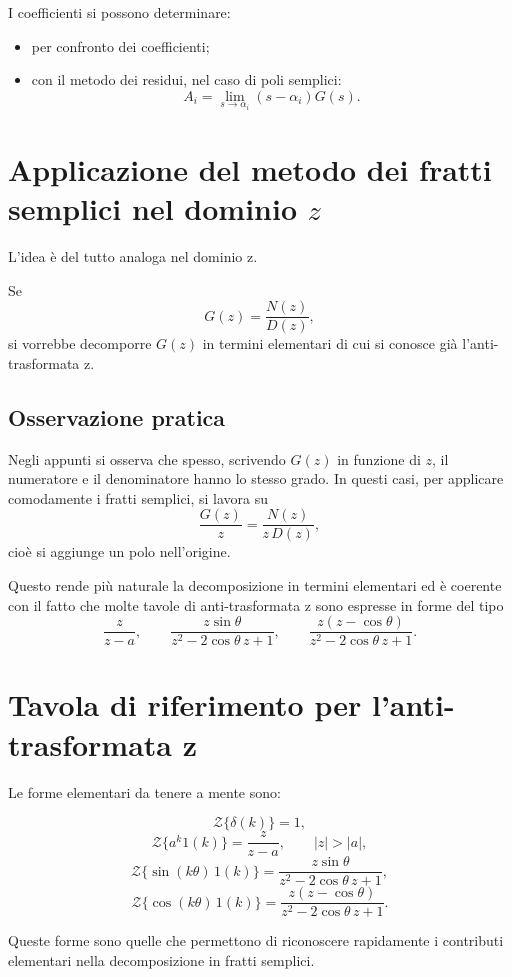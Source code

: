 I coefficienti si possono determinare:
\begin{itemize}
    \item per confronto dei coefficienti;
    \item con il metodo dei residui, nel caso di poli semplici:
    \[
    A_i=\lim_{s\to \alpha_i}(s-\alpha_i)G(s).
    \]
\end{itemize}

\section{Applicazione del metodo dei fratti semplici nel dominio \(z\)}

L'idea \`e del tutto analoga nel dominio z.

Se
\[
G(z)=\frac{N(z)}{D(z)},
\]
si vorrebbe decomporre \(G(z)\) in termini elementari di cui si conosce gi\`a
l'anti-trasformata z.

\subsection*{Osservazione pratica}

Negli appunti si osserva che spesso, scrivendo \(G(z)\) in funzione di \(z\),
il numeratore e il denominatore hanno lo stesso grado.
In questi casi, per applicare comodamente i fratti semplici,
si lavora su
\[
\frac{G(z)}{z}=\frac{N(z)}{z\,D(z)},
\]
cio\`e si aggiunge un polo nell'origine.

Questo rende pi\`u naturale la decomposizione in termini elementari
ed \`e coerente con il fatto che molte tavole di anti-trasformata z
sono espresse in forme del tipo
\[
\frac{z}{z-a}, \qquad
\frac{z\sin\theta}{z^2-2\cos\theta\,z+1},
\qquad
\frac{z(z-\cos\theta)}{z^2-2\cos\theta\,z+1}.
\]

\section{Tavola di riferimento per l'anti-trasformata z}

Le forme elementari da tenere a mente sono:

\[
\mathcal{Z}\{\delta(k)\}=1,
\]
\[
\mathcal{Z}\{a^k 1(k)\}=\frac{z}{z-a},
\qquad |z|>|a|,
\]
\[
\mathcal{Z}\{\sin(k\theta)\,1(k)\}
=
\frac{z\sin\theta}{z^2-2\cos\theta\,z+1},
\]
\[
\mathcal{Z}\{\cos(k\theta)\,1(k)\}
=
\frac{z(z-\cos\theta)}{z^2-2\cos\theta\,z+1}.
\]

Queste forme sono quelle che permettono di riconoscere rapidamente
i contributi elementari nella decomposizione in fratti semplici.

